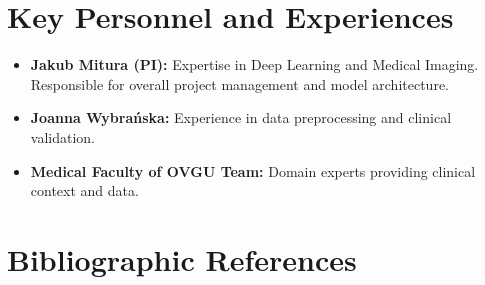 \documentclass[11pt,a4paper]{article}
\begin{document}
\section{Key Personnel and Experiences}
\label{sec:personnel}
\begin{itemize}
    \item \textbf{Jakub Mitura (PI):} Expertise in Deep Learning and Medical Imaging. Responsible for overall project management and model architecture.
    \item \textbf{Joanna Wybrańska:} Experience in data preprocessing and clinical validation.
    \item \textbf{Medical Faculty of OVGU Team:} Domain experts providing clinical context and data.
\end{itemize}

\section{Bibliographic References}


\end{document}
